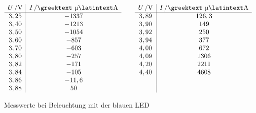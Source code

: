 \documentclass[numbers=noenddot,12pt,a4paper]{scrartcl}
\newcommand{\greek}[1]{\greektext#1\latintext}
\begin{document}
\begin{table}[H]
\begin{align*}
\begin{array}{c|c}
	\unit[U]{/V} & \unit[I]{/\text{\greek{µ}}A}\\\hline
	3,25 & -1337 \\
	3,40 & -1213 \\
	3,50 & -1054 \\
	3,60 & -857 \\
	3,70 & -603 \\
	3,80 & -257 \\
	3,82 & -171 \\
	3,84 & -105 \\
	3,86 & -11,6 \\
	3,88 & 50 \\
	\end{array}
	\hspace{2em}
	\begin{array}{c|c}
	\unit[U]{/V} & \unit[I]{/\text{\greek{µ}}A}\\\hline
	3,89 & 126,3 \\
	3,90 & 149 \\
	3,92 & 250 \\
	3,94 & 377 \\
	4,00 & 672 \\
	4,09 & 1306 \\
	4,20 & 2211 \\
	4,40 & 4608 \\
	\, & \, \\
	\, & \, \\
	\end{array}  
	\end{align*}
	\vspace{-1em}
	\caption{Messwerte bei Beleuchtung mit der blauen LED}
	\label{tab:blau}
\end{table}
\end{document}
